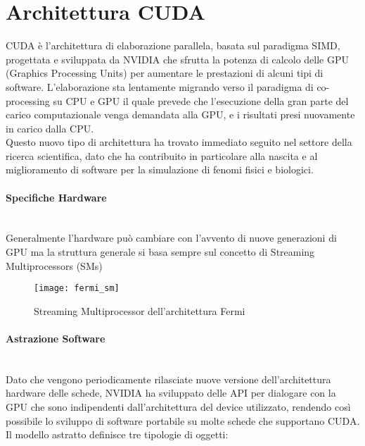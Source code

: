 \section{Architettura CUDA}

CUDA è l'architettura di elaborazione parallela, basata sul paradigma SIMD,
progettata e sviluppata da NVIDIA che sfrutta la potenza di calcolo delle GPU 
(Graphics Processing Units)
per aumentare le prestazioni di alcuni tipi di software.
L'elaborazione sta lentamente migrando verso il paradigma di 
co-processing su CPU e GPU il quale prevede che l'esecuzione della
gran parte del carico computazionale venga demandata alla GPU, e i risultati
presi nuovamente in carico dalla CPU.
\\
Questo nuovo tipo di architettura ha trovato immediato seguito nel settore
della ricerca scientifica, dato che ha contribuito in particolare alla nascita
e al miglioramento di software per la simulazione di fenomi fisici e
biologici.

\paragraph{Specifiche Hardware}\mbox{}
\\
Generalmente l'hardware può cambiare con l'avvento di
nuove generazioni di GPU ma la struttura generale si basa sempre sul concetto di
Streaming Multiprocessors (SMs) \cite{nickolls2010gpu}

\begin{figure}[H]
    \centering
    \texttt{[image: fermi\_sm]}
    \caption{Streaming Multiprocessor dell'architettura Fermi 
        \cite{nickolls2010gpu}}
\end{figure}

\paragraph{Astrazione Software}\mbox{}
\\
Dato che vengono periodicamente rilasciate nuove versione dell'architettura
hardware delle schede, NVIDIA ha sviluppato delle API per dialogare con la GPU
che sono indipendenti dall'architettura del device utilizzato, rendendo
così possibile lo sviluppo di software portabile su molte schede che
supportano CUDA.
\\
Il modello astratto definisce tre tipologie di oggetti:

